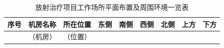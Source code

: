 \begin{table}[H]
\centering
\caption{放射治疗项目工作场所平面布置及周围环境一览表}
\label{tab:ch4-surroundings}
\begin{tabular}{|
>{\centering\arraybackslash}m{1.0cm}|
>{\centering\arraybackslash}m{1.8cm}|
>{\centering\arraybackslash}m{1.8cm}|
>{\centering\arraybackslash}m{1.8cm}|
>{\centering\arraybackslash}m{1.8cm}|
>{\centering\arraybackslash}m{1.5cm}|
>{\centering\arraybackslash}m{1.2cm}|
>{\centering\arraybackslash}m{1.2cm}|
>{\centering\arraybackslash}m{1.2cm}|
}
\hline
序号 & 机房名称 & 所在位置 & 东侧 & 南侧 & 西侧 & 北侧 & 上方 & 下方 \\
\hline
1 & （机房） & （位置） &  &  &  &  &  &  \\
\hline
\end{tabular}
\end{table}
